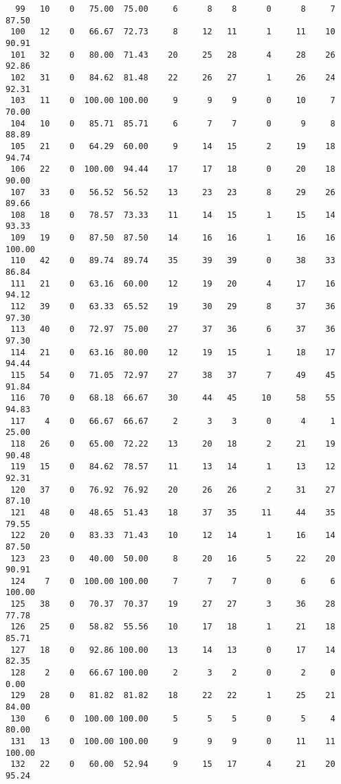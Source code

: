 \begin{verbatim}
  99   10    0   75.00  75.00     6      8    8      0      8     7    87.50
 100   12    0   66.67  72.73     8     12   11      1     11    10    90.91
 101   32    0   80.00  71.43    20     25   28      4     28    26    92.86
 102   31    0   84.62  81.48    22     26   27      1     26    24    92.31
 103   11    0  100.00 100.00     9      9    9      0     10     7    70.00
 104   10    0   85.71  85.71     6      7    7      0      9     8    88.89
 105   21    0   64.29  60.00     9     14   15      2     19    18    94.74
 106   22    0  100.00  94.44    17     17   18      0     20    18    90.00
 107   33    0   56.52  56.52    13     23   23      8     29    26    89.66
 108   18    0   78.57  73.33    11     14   15      1     15    14    93.33
 109   19    0   87.50  87.50    14     16   16      1     16    16   100.00
 110   42    0   89.74  89.74    35     39   39      0     38    33    86.84
 111   21    0   63.16  60.00    12     19   20      4     17    16    94.12
 112   39    0   63.33  65.52    19     30   29      8     37    36    97.30
 113   40    0   72.97  75.00    27     37   36      6     37    36    97.30
 114   21    0   63.16  80.00    12     19   15      1     18    17    94.44
 115   54    0   71.05  72.97    27     38   37      7     49    45    91.84
 116   70    0   68.18  66.67    30     44   45     10     58    55    94.83
 117    4    0   66.67  66.67     2      3    3      0      4     1    25.00
 118   26    0   65.00  72.22    13     20   18      2     21    19    90.48
 119   15    0   84.62  78.57    11     13   14      1     13    12    92.31
 120   37    0   76.92  76.92    20     26   26      2     31    27    87.10
 121   48    0   48.65  51.43    18     37   35     11     44    35    79.55
 122   20    0   83.33  71.43    10     12   14      1     16    14    87.50
 123   23    0   40.00  50.00     8     20   16      5     22    20    90.91
 124    7    0  100.00 100.00     7      7    7      0      6     6   100.00
 125   38    0   70.37  70.37    19     27   27      3     36    28    77.78
 126   25    0   58.82  55.56    10     17   18      1     21    18    85.71
 127   18    0   92.86 100.00    13     14   13      0     17    14    82.35
 128    2    0   66.67 100.00     2      3    2      0      2     0     0.00
 129   28    0   81.82  81.82    18     22   22      1     25    21    84.00
 130    6    0  100.00 100.00     5      5    5      0      5     4    80.00
 131   13    0  100.00 100.00     9      9    9      0     11    11   100.00
 132   22    0   60.00  52.94     9     15   17      4     21    20    95.24

\end{verbatim}
